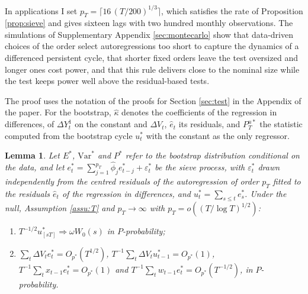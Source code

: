 \documentclass[12pt,a4paper]{article}
\newtheorem{lem}{Lemma}
\theoremstyle{definition}
\begin{document}
In applications I set $p_T=\lceil 16\,(T/200)^{1/3}\rceil$, which satisfies the rate of Proposition \ref{prop:sieve} and gives sixteen lags with two hundred monthly observations. The simulations of Supplementary Appendix \ref{sec:montecarlo} show that data-driven choices of the order select autoregressions too short to capture the dynamics of a differenced persistent cycle, that shorter fixed orders leave the test oversized and longer ones cost power, and that this rule delivers close to the nominal size while the test keeps power well above the residual-based tests.

The proof uses the notation of the proofs for Section \ref{sec:test} in the Appendix of the paper. For the bootstrap, $\hat\kappa$ denotes the coefficients of the regression in differences, of $\Delta Y^1_t$ on the constant and $\Delta V_t$, $\hat e_t$ its residuals, and $P^{u\ast}_T$ the statistic computed from the bootstrap cycle $u^\ast_t$ with the constant as the only regressor.

\begin{lem}\label{lem:boot}
Let $E^\ast$, $\mathrm{Var}^\ast$ and $P^\ast$ refer to the bootstrap distribution conditional on the data, and let $e^\ast_t=\sum_{j=1}^{p_T}\hat\phi_je^\ast_{t-j}+\varepsilon^\ast_t$ be the sieve process, with $\varepsilon^\ast_t$ drawn independently from the centred residuals of the autoregression of order $p_T$ fitted to the residuals $\hat e_t$ of the regression in differences, and $u^\ast_t=\sum_{s\leq t}e^\ast_s$. Under the null, Assumption \ref{assu:T} and $p_T\to\infty$ with $p_T=o((T/\log T)^{1/2})$:
\begin{enumerate}
\item[(a)] $T^{-1/2}u^\ast_{[sT]}\Rightarrow\omega W_0(s)$ in $P$-probability;
\item[(b)] $\sum_t\Delta V_te^\ast_t=O_{p^\ast}(T^{1/2})$, $T^{-1}\sum_t\Delta V_tu^\ast_{t-1}=O_{p^\ast}(1)$, $T^{-1}\sum_tx_{t-1}e^\ast_t=O_{p^\ast}(1)$ and $T^{-1}\sum_tw_{t-1}e^\ast_t=O_{p^\ast}(T^{-1/2})$, in $P$-probability.
\end{enumerate}
\end{lem}
\end{document}
